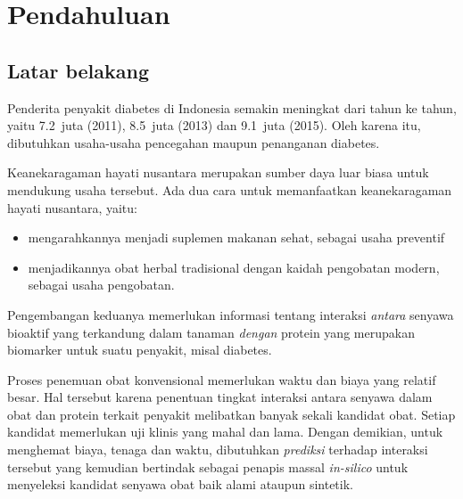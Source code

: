 \chapter{Pendahuluan}

\section{Latar belakang}
Penderita penyakit diabetes di Indonesia semakin meningkat dari tahun ke tahun, 
yaitu 7.2~juta (2011), 8.5~juta (2013) dan 9.1~juta (2015).
Oleh karena itu, dibutuhkan usaha-usaha pencegahan maupun penanganan diabetes.

Keanekaragaman hayati nusantara merupakan sumber daya luar biasa untuk mendukung usaha tersebut.
Ada dua cara untuk memanfaatkan keanekaragaman hayati nusantara, yaitu:
\begin{itemize} [topsep=0mm]
\itemsep0mm
\item mengarahkannya menjadi suplemen makanan sehat, sebagai usaha preventif
\item menjadikannya obat herbal tradisional dengan kaidah pengobatan modern, sebagai usaha pengobatan.
\end{itemize}
Pengembangan keduanya memerlukan informasi tentang interaksi \emph{antara} senyawa bioaktif yang terkandung dalam tanaman \emph{dengan} protein yang merupakan biomarker untuk suatu penyakit, misal diabetes.

Proses penemuan obat konvensional memerlukan waktu dan biaya yang relatif besar.
Hal tersebut karena penentuan tingkat interaksi antara senyawa dalam obat dan protein terkait penyakit melibatkan banyak sekali kandidat obat.
Setiap kandidat memerlukan uji klinis yang mahal dan lama.
Dengan demikian, untuk menghemat biaya, tenaga dan waktu, dibutuhkan \emph{prediksi} terhadap interaksi tersebut yang kemudian bertindak sebagai penapis massal \emph{in-silico} untuk menyeleksi kandidat senyawa obat baik alami ataupun sintetik.

